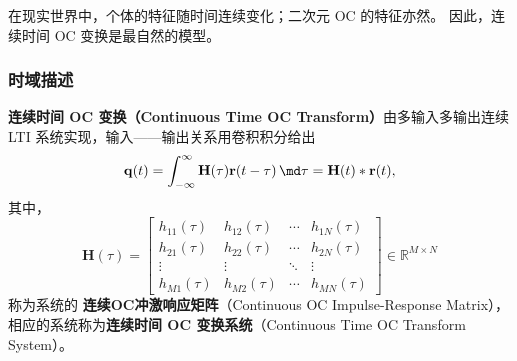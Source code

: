 在现实世界中，个体的特征随时间连续变化；二次元 OC 的特征亦然。
因此，连续时间 OC 变换是最自然的模型。

\subsubsection{时域描述}

\begin{theorem}
    \textbf{连续时间 OC 变换（Continuous Time OC Transform）}由多输入多输出连续 LTI 系统实现，输入——输出关系用卷积积分给出
    \begin{equation}
        \mathbf{q}(t)=\int_{-\infty}^{\infty}\mathbf{H}(\tau)\mathbf{r}(t-\tau)\,\md\tau = \mathbf{H}(t)*\mathbf{r}(t),
        \label{eq:conv-cont}
    \end{equation}
    其中，
    \begin{equation}
        \mathbf{H}(\tau) = \begin{bmatrix}
            h_{11}(\tau) & h_{12}(\tau) & \cdots & h_{1N}(\tau) \\
            h_{21}(\tau) & h_{22}(\tau) & \cdots & h_{2N}(\tau) \\
            \vdots       & \vdots       & \ddots & \vdots       \\
            h_{M1}(\tau) & h_{M2}(\tau) & \cdots & h_{MN}(\tau)
        \end{bmatrix}
        \in\mathbb{R}^{M\times N}
    \end{equation}
    称为系统的 \textbf{连续OC冲激响应矩阵}（Continuous OC Impulse-Response Matrix），相应的系统称为\textbf{连续时间 OC 变换系统}（Continuous Time OC Transform System）。
\end{theorem}

